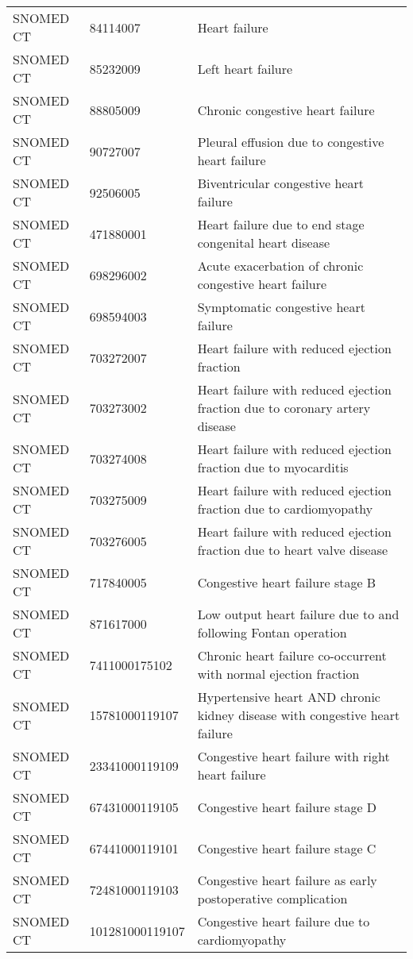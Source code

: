 \begin{longtable}{p{}p{}p{}}
  SNOMED CT & 84114007 & Heart failure \\ 
  SNOMED CT & 85232009 & Left heart failure \\ 
  SNOMED CT & 88805009 & Chronic congestive heart failure \\ 
  SNOMED CT & 90727007 & Pleural effusion due to congestive heart failure \\ 
  SNOMED CT & 92506005 & Biventricular congestive heart failure \\ 
  SNOMED CT & 471880001 & Heart failure due to end stage congenital heart disease \\ 
  SNOMED CT & 698296002 & Acute exacerbation of chronic congestive heart failure \\ 
  SNOMED CT & 698594003 & Symptomatic congestive heart failure \\ 
  SNOMED CT & 703272007 & Heart failure with reduced ejection fraction \\ 
  SNOMED CT & 703273002 & Heart failure with reduced ejection fraction due to coronary artery disease \\ 
  SNOMED CT & 703274008 & Heart failure with reduced ejection fraction due to myocarditis \\ 
  SNOMED CT & 703275009 & Heart failure with reduced ejection fraction due to cardiomyopathy \\ 
  SNOMED CT & 703276005 & Heart failure with reduced ejection fraction due to heart valve disease \\ 
  SNOMED CT & 717840005 & Congestive heart failure stage B \\ 
  SNOMED CT & 871617000 & Low output heart failure due to and following Fontan operation \\ 
  SNOMED CT & 7411000175102 & Chronic heart failure co-occurrent with normal ejection fraction \\ 
  SNOMED CT & 15781000119107 & Hypertensive heart AND chronic kidney disease with congestive heart failure \\ 
  SNOMED CT & 23341000119109 & Congestive heart failure with right heart failure \\ 
  SNOMED CT & 67431000119105 & Congestive heart failure stage D \\ 
  SNOMED CT & 67441000119101 & Congestive heart failure stage C \\ 
  SNOMED CT & 72481000119103 & Congestive heart failure as early postoperative complication \\ 
  SNOMED CT & 101281000119107 & Congestive heart failure due to cardiomyopathy \\ 

\end{longtable}
